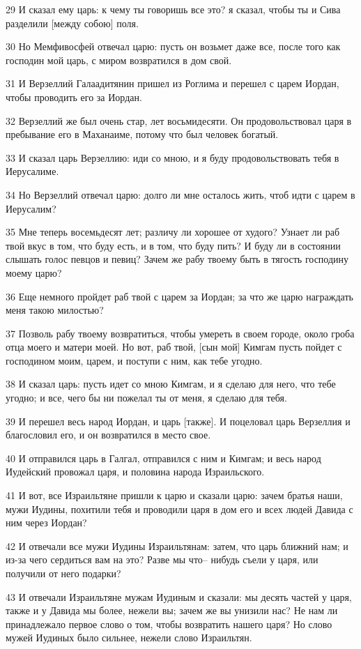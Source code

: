 \par 29 И сказал ему царь: к чему ты говоришь все это? я сказал, чтобы ты и Сива разделили [между собою] поля.
\par 30 Но Мемфивосфей отвечал царю: пусть он возьмет даже все, после того как господин мой царь, с миром возвратился в дом свой.
\par 31 И Верзеллий Галаадитянин пришел из Роглима и перешел с царем Иордан, чтобы проводить его за Иордан.
\par 32 Верзеллий же был очень стар, лет восьмидесяти. Он продовольствовал царя в пребывание его в Маханаиме, потому что был человек богатый.
\par 33 И сказал царь Верзеллию: иди со мною, и я буду продовольствовать тебя в Иерусалиме.
\par 34 Но Верзеллий отвечал царю: долго ли мне осталось жить, чтоб идти с царем в Иерусалим?
\par 35 Мне теперь восемьдесят лет; различу ли хорошее от худого? Узнает ли раб твой вкус в том, что буду есть, и в том, что буду пить? И буду ли в состоянии слышать голос певцов и певиц? Зачем же рабу твоему быть в тягость господину моему царю?
\par 36 Еще немного пройдет раб твой с царем за Иордан; за что же царю награждать меня такою милостью?
\par 37 Позволь рабу твоему возвратиться, чтобы умереть в своем городе, около гроба отца моего и матери моей. Но вот, раб твой, [сын мой] Кимгам пусть пойдет с господином моим, царем, и поступи с ним, как тебе угодно.
\par 38 И сказал царь: пусть идет со мною Кимгам, и я сделаю для него, что тебе угодно; и все, чего бы ни пожелал ты от меня, я сделаю для тебя.
\par 39 И перешел весь народ Иордан, и царь [также]. И поцеловал царь Верзеллия и благословил его, и он возвратился в место свое.
\par 40 И отправился царь в Галгал, отправился с ним и Кимгам; и весь народ Иудейский провожал царя, и половина народа Израильского.
\par 41 И вот, все Израильтяне пришли к царю и сказали царю: зачем братья наши, мужи Иудины, похитили тебя и проводили царя в дом его и всех людей Давида с ним через Иордан?
\par 42 И отвечали все мужи Иудины Израильтянам: затем, что царь ближний нам; и из-за чего сердиться вам на это? Разве мы что-- нибудь съели у царя, или получили от него подарки?
\par 43 И отвечали Израильтяне мужам Иудиным и сказали: мы десять частей у царя, также и у Давида мы более, нежели вы; зачем же вы унизили нас? Не нам ли принадлежало первое слово о том, чтобы возвратить нашего царя? Но слово мужей Иудиных было сильнее, нежели слово Израильтян.

